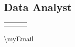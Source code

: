 \documentclass[jdlanctot]{mycv}
\begin{document}
\begin{paracol}{2}
\section*{Data Analyst}
\begin{tabular}{r!{\hspace{2mm}\color{titlerulecolour}\vrule width 1pt\hspace{1mm}} p{0.5\textwidth} c}
    \\
    \vspace{-1em}
\end{tabular}
\vspace{1em}

\end{paracol}

\vfill{} %
\setlength{\parindent}{0pt}
\centering
\begin{minipage}[t]{\textwidth}
    \begin{center}\fontfamily{\sfdefault}\selectfont \color{black!70}
    {\small \myName {} \myJob {} \myLocation {} \myNumber {} \protect\url{\myEmail}
    }
\end{center}
\end{minipage}
\end{document}
